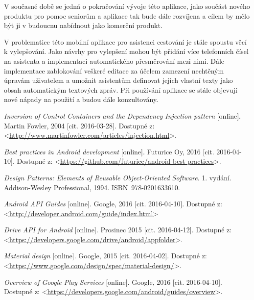 \documentclass[czech,master,public,dept460,male,java,cpdeclaration]{diploma}
\begin{document}
V současné době se jedná o pokračování vývoje této aplikace, jako součást nového produktu pro pomoc seniorům
a aplikace tak bude dále rozvíjena a cílem by mělo být ji v budoucnu nabídnout jako komerční produkt.

V problematice této mobilní aplikace pro asistenci cestování je stále spoustu věcí k vylepšování.
Jako návrhy pro vylepšení mohou být přidání více telefonních čísel na asistenta a implementaci automatického
přesměrování mezi nimi. Dále implementace zablokování veškeré editace za účelem zamezení nechtěným
úpravám uživatelem a umožnit asistentům definovat jejich vlastní texty jako obsah automatickým textových zpráv.
Při používání aplikace se stále objevují nové nápady na použití a budou dále konzultovány.



\begin{thebibliography}{99}

\textit{Inversion of Control Containers and the Dependency Injection pattern} [online]. {Martin Fowler, 2004} [cit. 2016-03-28].
Dostupné z: <\url{http://www.martinfowler.com/articles/injection.html}>.


\textit{Best practices in Android development} [online]. {Futurice Oy, 2016} [cit. 2016-04-10].
Dostupné z: <\url{https://github.com/futurice/android-best-practices}>.


\textit{Design Patterns: Elements of Reusable Object-Oriented Software}. 1. vydání. {Addison-Wesley Professional, 1994}. ISBN~978-0201633610.


\textit{Android API Guides} [online]. {Google, 2016} [cit. 2016-04-10].
\newline Dostupné z: <\url{http://developer.android.com/guide/index.html}>

\textit{Drive API for Android} [online]. {Prosinec 2015 [cit. 2016-04-12].
\newline Dostupné z: <\url{https://developers.google.com/drive/android/appfolder}>.}

\textit{Material design} [online]. {Google, 2015} [cit. 2016-04-02].
\newline Dostupné z: <\url{https://www.google.com/design/spec/material-design/}>.

\textit{Overview of Google Play Services} [online]. {Google, 2016 [cit. 2016-04-10].
Dostupné z: <\url{https://developers.google.com/android/guides/overview}>.}


\end{thebibliography}
\end{document}

